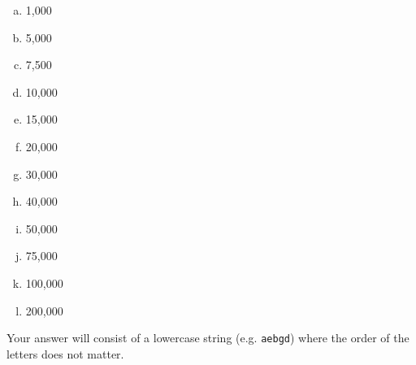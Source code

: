 \documentclass[12pt,landscape]{article}
\newcommand{\instr}{\small Your answer will consist of a lowercase string (e.g. \texttt{aebgd}) where the order of the letters does not matter. \normalsize}
\begin{document}
\vspace{-0.2cm}\benum{}
\begin{multicols}{2}
\begin{enumerate}[(a)]
\item 1,000
\item 5,000
\item 7,500
\item 10,000
\item 15,000
\item 20,000
\item 30,000
\item 40,000
\item 50,000
\item 75,000
\item 100,000
\item 200,000

\end{enumerate}
\end{multicols}
\eenum\instr\pagebreak
\end{document}

